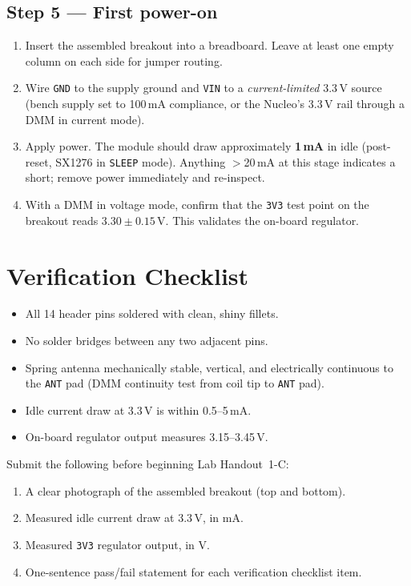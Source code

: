 \documentclass[11pt,letterpaper]{article}
\begin{document}
\newpage
\subsection{Step 5 --- First power-on}
\begin{enumerate}[leftmargin=2em]
	\item Insert the assembled breakout into a breadboard. Leave at least one empty column on each side for jumper routing.
	\item Wire \texttt{GND} to the supply ground and \texttt{VIN} to a \textit{current-limited} 3.3\,V source (bench supply set to 100\,mA compliance, or the Nucleo's 3.3\,V rail through a \mbox{DMM} in current mode).
	\item Apply power. The module should draw approximately \textbf{1\,mA} in idle (post-reset, SX1276 in \texttt{SLEEP} mode). Anything $>$20\,mA at this stage indicates a short; remove power immediately and re-inspect.
	\item With a \mbox{DMM} in voltage mode, confirm that the \texttt{3V3} test point on the breakout reads $3.30\pm0.15$\,V. This validates the on-board regulator.
\end{enumerate}


\newpage
\section{Verification Checklist}
\begin{itemize}[leftmargin=2em]
	\item[$\square$] All 14 header pins soldered with clean, shiny fillets.
	\item[$\square$] No solder bridges between any two adjacent pins.
	\item[$\square$] Spring antenna mechanically stable, vertical, and electrically continuous to the \texttt{ANT} pad (\mbox{DMM} continuity test from coil tip to \texttt{ANT} pad).
	\item[$\square$] Idle current draw at 3.3\,V is within 0.5--5\,mA.
	\item[$\square$] On-board regulator output measures 3.15--3.45\,V.
\end{itemize}

\begin{tcolorbox}[deliverable={Lab Handout 1-A Deliverable}]
	Submit the following before beginning Lab Handout~1-C:
	\begin{enumerate}[leftmargin=1.2em]
		\item A clear photograph of the assembled breakout (top and bottom).
		\item Measured idle current draw at 3.3\,V, in mA.
		\item Measured \texttt{3V3} regulator output, in V.
		\item One-sentence pass/fail statement for each verification checklist item.
	\end{enumerate}
\end{tcolorbox}

\printhandoutglossary
\end{document}
